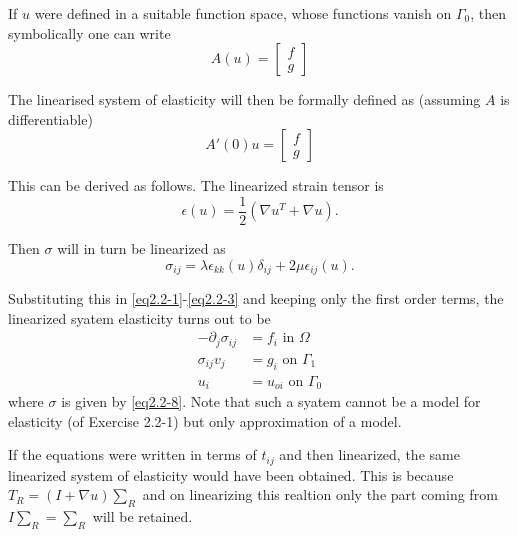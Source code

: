 If $u$ were defined in a suitable function space, whose functions
vanish on $\Gamma _0$, then symbolically one can write 
\begin{equation*}
  A(u)=\begin{bmatrix} 
  f \\ 
  g 
  \end{bmatrix}\tag{2.2-6}\label{eq2.2-6}
\end{equation*}

The linearised system of elasticity will then be formally defined as
(assuming $A$ is differentiable) 
$$
  A'(0)u=
  \begin{bmatrix} 
    f \\ 
    g 
  \end{bmatrix}
$$

This can be derived as follows. The linearized strain
tensor is  
\begin{equation*}
  \epsilon (u)=\frac{1}{2}\left(\nabla u^T + \nabla
  u\right).\tag{2.2-7} \label{eq2.2-7}
\end{equation*}

Then $\sigma$ will in turn be linearized as 
\begin{equation*}
  \sigma_{ij} = \lambda \epsilon_{kk}(u) \delta_{ij} + 2\mu
  \epsilon_{ij} (u).\tag{2.2-8} \label{eq2.2-8}
\end{equation*}\pageoriginale

Substituting this in \eqref{eq2.2-1}-\eqref{eq2.2-3} and keeping only
the first order 
terms, the linearized syatem elasticity turns out to be  
\begin{align*}
  -\partial_{j} \sigma_{ij} &=f_i \text{ \ in\ }
  \Omega\tag{2.2-9}\label{eq2.2-9}\\ 
  \sigma_{ij} v_j &= g_i \text{ \ on\ } \Gamma_1\tag{2.2-10}\label{eq2.2-10}\\
  u_i &= u_{oi} \text{ \ on\ } \Gamma_0\tag{2.2-11}\label{eq2.2-11}
 \end{align*} 
 where $\sigma$ is given by \eqref{eq2.2-8}. Note that such a syatem
 cannot be 
 a model for elasticity (of Exercise 2.2-1) but only approximation
 of a model. 
 
 \begin{remark}\label{chap2-rem2.2.1} %
   If the equations were written in terms of $t_{ij}$ and then
   linearized, the same linearized system of elasticity would have
   been obtained. This is because $T_R= (I+ \nabla u)
   \sum\limits_R$ and on linearizing this realtion only the part
   coming from $I\sum\limits_R = \sum\limits_R$ will be retained. 
 \end{remark}
 
